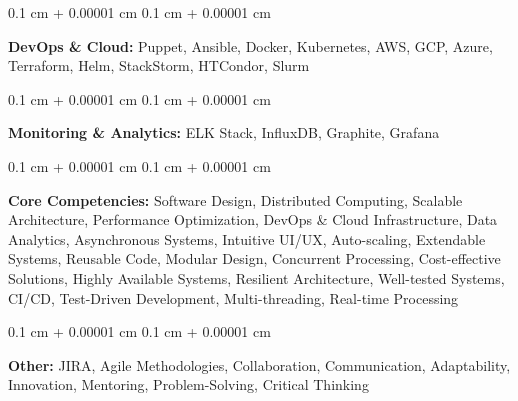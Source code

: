 \documentclass[11pt, a4paper]{article}
\newenvironment{onecolentry}{
    \begin{adjustwidth}{
        0.1 cm + 0.00001 cm
    }{
        0.1 cm + 0.00001 cm
    }
}{
    \end{adjustwidth}
} %
\begin{document}
        \begin{onecolentry}
            \textbf{DevOps \& Cloud:} Puppet, Ansible, Docker, Kubernetes, AWS, GCP, Azure, Terraform, Helm, StackStorm, HTCondor, Slurm
        \end{onecolentry}

        \vspace{0.1 cm}

        \begin{onecolentry}
            \textbf{Monitoring \& Analytics:} ELK Stack, InfluxDB, Graphite, Grafana
        \end{onecolentry}

        \vspace{0.1 cm}

        \begin{onecolentry}
            \textbf{Core Competencies:} Software Design, Distributed Computing, Scalable Architecture, Performance Optimization, DevOps \& Cloud Infrastructure, Data Analytics, Asynchronous Systems, Intuitive UI/UX, Auto-scaling, Extendable Systems, Reusable Code, Modular Design, Concurrent Processing, Cost-effective Solutions, Highly Available Systems, Resilient Architecture, Well-tested Systems, CI/CD, Test-Driven Development, Multi-threading, Real-time Processing
        \end{onecolentry}

        \vspace{0.1 cm}

        \begin{onecolentry}
            \textbf{Other:} JIRA, Agile Methodologies, Collaboration, Communication, Adaptability, Innovation, Mentoring, Problem-Solving, Critical Thinking
        \end{onecolentry}


    
\end{document}
